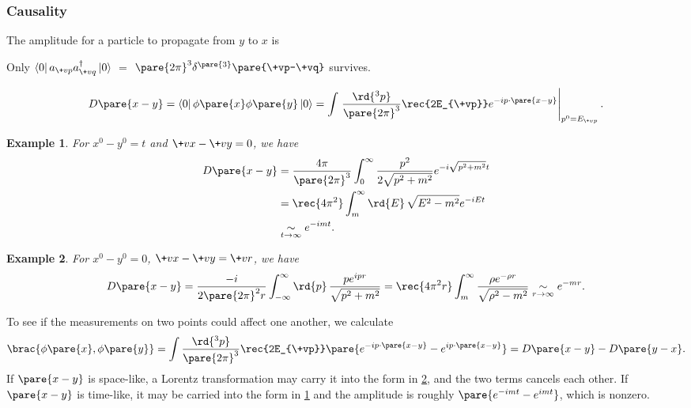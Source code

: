 \documentclass[hidelinks]{article}
\newtheorem{example}{Example}
\begin{document}
\subsubsection{Causality} %
\label{ssub:causality}

The amplitude for a particle to propagate from $y$ to $x$ is \begin{margintips}
    \raggedright
    Only $\bra{0} a_{\+vp} a^\dagger_{\+vq}\ket{0}$ $=$ $\pare{2\pi}^3 \delta^{\pare{3}}\pare{\+vp-\+vq}$ survives.
\end{margintips}
\[ D\pare{x-y} = \bra{0}\phi\pare{x}\phi\pare{y}\ket{0} = \int \left.\frac{\rd{^3 p}}{\pare{2\pi}^3} \rec{2E_{\+vp}} e^{-ip\cdot \pare{x-y}}\right\vert_{p^0 = E_{\+vp}}. \]
\begin{sample}
    \begin{example}
    \label{ex:time_like_propagator}
        For $x^0 - y^0 = t$ and $\+vx - \+vy = 0$, we have
        \begin{align*}
            D\pare{x-y} &= \frac{4\pi}{\pare{2\pi}^3} \int_0^\infty \frac{p^2}{2\sqrt{p^2 + m^2}} e^{-i\sqrt{p^2 + m^2}t} \\
            &= \rec{4\pi^2} \int_m^\infty \rd{E}\, \sqrt{E^2 - m^2} e^{-iEt} \\
            & \underset{t\rightarrow \infty}{\sim} e^{-imt}.
        \end{align*}
    \end{example}
\end{sample}
\begin{sample}
    \begin{example}
    \label{ex:space_like_propagator}
        For $x^0 - y^0 = 0$, $\+vx - \+vy = \+vr$, we have
        \begin{align*}
            D\pare{x-y} = \frac{-i}{2\pare{2\pi}^2 r} \int_{-\infty}^{\infty}\rd{p}\, \frac{pe^{ipr}}{\sqrt{p^2 + m^2}} = \rec{4\pi^2 r} \int_m^\infty \frac{\rho e^{-\rho r}}{\sqrt{\rho^2 - m^2}} \underset{r\rightarrow \infty}{\sim} e^{-mr}.
        \end{align*}
    \end{example}
\end{sample}
To see if the measurements on two points could affect one another, we calculate
\begin{equation}
    \label{eq:commutator_of_position_field}
    \brac{\phi\pare{x},\phi\pare{y}} = \int \frac{\rd{^3 p}}{\pare{2\pi}^3} \rec{2E_{\+vp}}\pare{e^{-ip\cdot \pare{x-y}} - e^{ip\cdot \pare{x-y}}} = D\pare{x-y} - D\pare{y-x}.
\end{equation}
If $\pare{x-y}$ is space-like, a Lorentz transformation may carry it into the form in \cref{ex:space_like_propagator}, and the two terms cancels each other. If $\pare{x-y}$ is time-like, it may be carried into the form in \cref{ex:time_like_propagator} and the amplitude is roughly $\pare{e^{-imt} - e^{imt}}$, which is nonzero.
\end{document}
